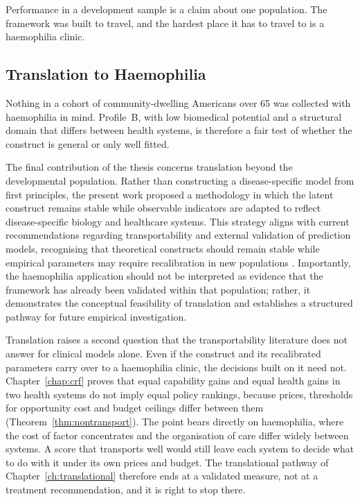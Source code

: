 Performance in a development sample is a claim about one population. The
framework was built to travel, and the hardest place it has to travel to is a
haemophilia clinic.

\subsection{Translation to Haemophilia}
\label{sec:disc-translation}

Nothing in a cohort of community-dwelling Americans over 65 was collected with
haemophilia in mind. Profile~B, with low biomedical potential and a structural
domain that differs between health systems, is therefore a fair test of whether
the construct is general or only well fitted.

The final contribution of the thesis concerns translation beyond the developmental population. Rather than constructing a disease-specific model from first principles, the present work proposed a methodology in which the latent construct remains stable while observable indicators are adapted to reflect disease-specific biology and healthcare systems. This strategy aligns with current recommendations regarding transportability and external validation of prediction models, recognising that theoretical constructs should remain stable while empirical parameters may require recalibration in new populations \citep{moons_2019,collins_2024}. Importantly, the haemophilia application should not be interpreted as evidence that the framework has already been validated within that population; rather, it demonstrates the conceptual feasibility of translation and establishes a structured pathway for future empirical investigation.

Translation raises a second question that the transportability literature does not
answer for clinical models alone. Even if the construct and its recalibrated
parameters carry over to a haemophilia clinic, the decisions built on it need not.
Chapter~\ref{chap:crf} proves that equal capability gains and equal health gains in
two health systems do not imply equal policy rankings, because prices, thresholds
for opportunity cost and budget ceilings differ between them
(Theorem~\ref{thm:nontransport}). The point bears directly on haemophilia, where
the cost of factor concentrates and the organisation of care differ widely between
systems. A score that transports well would still leave each system to decide what
to do with it under its own prices and budget. The translational pathway of
Chapter~\ref{ch:translational} therefore ends at a validated measure, not at a
treatment recommendation, and it is right to stop there.

